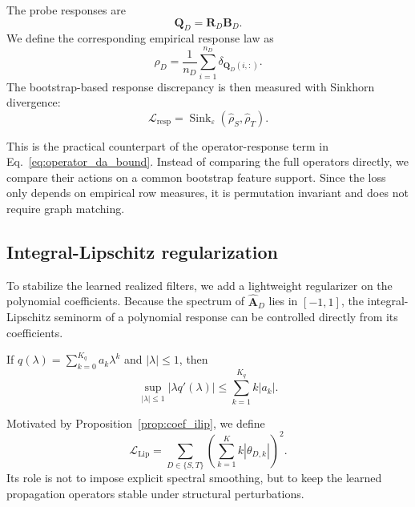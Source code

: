 \documentclass[runningheads]{llncs}
\def\sL{{\mathcal{L}}}
\def\mA{{\mathbf{A}}}
\def\mB{{\mathbf{B}}}
\def\mQ{{\mathbf{Q}}}
\def\mR{{\mathbf{R}}}
\DeclareMathOperator{\Sink}{Sink}
\begin{document}
The probe responses are
\begin{equation}
\mQ_D = \mR_D \mB_D.
\label{eq:bootstrap_response}
\end{equation}
We define the corresponding empirical response law as
\begin{equation}
\widehat\rho_D
=
\frac{1}{n_D}\sum_{i=1}^{n_D}\delta_{\mQ_D(i,:)}.
\label{eq:response_measure}
\end{equation}
The bootstrap-based response discrepancy is then measured with Sinkhorn divergence:
\begin{equation}
\sL_{\mathrm{resp}}
=
\Sink_\varepsilon(\widehat\rho_S,\widehat\rho_T).
\label{eq:response_loss}
\end{equation}

This is the practical counterpart of the operator-response term in Eq.~\eqref{eq:operator_da_bound}. Instead of comparing the full operators directly, we compare their actions on a common bootstrap feature support. Since the loss only depends on empirical row measures, it is permutation invariant and does not require graph matching.

\subsection{Integral-Lipschitz regularization}

To stabilize the learned realized filters, we add a lightweight regularizer on the polynomial coefficients. Because the spectrum of $\widehat{\mA}_D$ lies in $[-1,1]$, the integral-Lipschitz seminorm of a polynomial response can be controlled directly from its coefficients.

\begin{proposition}
\label{prop:coef_ilip}
If $q(\lambda)=\sum_{k=0}^{K_q} a_k \lambda^k$ and $|\lambda|\le 1$, then
\begin{equation}
\sup_{|\lambda|\le 1}|\lambda q'(\lambda)|
\le
\sum_{k=1}^{K_q} k|a_k|.
\label{eq:coef_ilip}
\end{equation}
\end{proposition}

Motivated by Proposition~\ref{prop:coef_ilip}, we define
\begin{equation}
\sL_{\mathrm{Lip}}
=
\sum_{D\in\{S,T\}}
\left(
\sum_{k=1}^{K} k|\theta_{D,k}|
\right)^2.
\label{eq:ilip_loss}
\end{equation}
Its role is not to impose explicit spectral smoothing, but to keep the learned propagation operators stable under structural perturbations.
\end{document}
